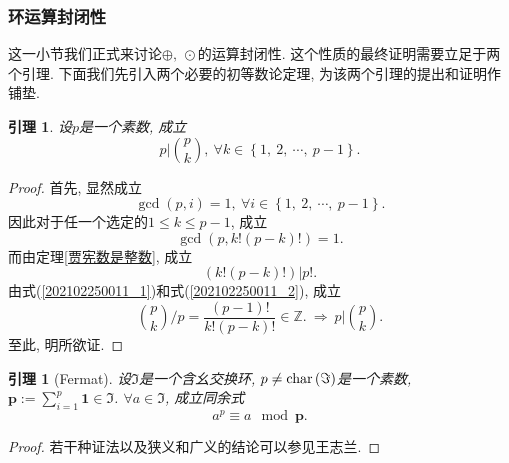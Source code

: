 \documentclass[UTF8, twoside]{ctexart}
\theoremstyle{nonumberplain}
\newtheorem{proof}{\heiti 证明}  %
\theoremstyle{nonumberplain}
\theoremstyle{plain}
\newtheorem{yinli4}[dingyi4]{引理}
\begin{document}
	\subsubsection{环运算封闭性}
	这一小节我们正式来讨论$\oplus,\ \odot $的运算封闭性. 
	这个性质的最终证明需要立足于两个引理. 下面我们先引入两个必要的初等数论定理, 为该两个引理的提出和证明作铺垫.
	\begin{yinli4} \label{p整除(p, k)}
		设$p$是一个素数, 成立
		\[
			\left. p \right|\binom{p}{k}
			,\ \forall k\in \left\{ 1,\ 2,\ \cdots ,\ p-1 \right\}.
		\]
	\end{yinli4}
	\begin{proof}
		首先, 显然成立
		\[
			\gcd \left( p,i \right)=1,\ \forall i\in \left\{ 1,\ 2,\ \cdots,\ p-1 \right\}.
		\]
		因此对于任一个选定的$1\le k\le p-1$, 成立
		\begin{equation} \label{202102250011_1}
			\gcd \left( p,k!\left( p-k \right)! \right)=1.
		\end{equation}
		而由定理\ref{贾宪数是整数}, 成立
		\begin{equation} \label{202102250011_2}
			\left. \left( k!\left( p-k \right)! \right) \right|p!.
		\end{equation}
		由式(\ref{202102250011_1})和式(\ref{202102250011_2}), 成立
		\[
			\binom{p}{k} / p=\frac{\left( p-1 \right)!}{k!\left( p-k \right)!}\in \mathbb{Z}.
			\ \Longrightarrow \ 
			\left. p \right|\binom{p}{k}.
		\]
		至此, 明所欲证. 
	\end{proof}
	\begin{yinli4}[Fermat] \label{费马小定理}
		设$\Im $是一个含幺交换环, $p\ne \textup{char}\left( \Im  \right)$是一个素数, $\bm{p}:=\sum_{i=1}^{p}{\bm{1}\in \Im }$. $\forall a\in \Im $, 成立同余式
		\[
		{{a}^{p}}\equiv a\ \bmod \bm{p}.
		\]
	\end{yinli4}
	\begin{proof}
		若干种证法以及狭义和广义的结论可以参见王志兰\cite{wangzhilan}.
	\end{proof}
	\vskip 0.5cm
	
\end{document}
